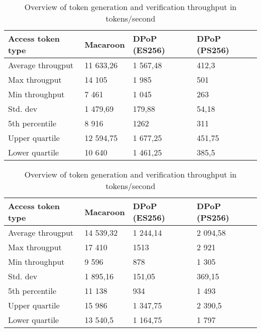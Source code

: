 \begin{table}[H]
\begin{subtable}{1.0\textwidth}
\centering
\begin{tabular}{llll}
\textbf{Access token type} & \textbf{Macaroon} & \textbf{DPoP (ES256)} & \textbf{DPoP (PS256)} \\ \hline
Average througput          & 11 633,26          & 1 567,48               & 412,3                 \\
Max througput              & 14 105             & 1 985                  & 501                   \\
Min throughput             & 7 461              & 1 045                  & 263                   \\
Std. dev                   & 1 479,69           & 179,88                & 54,18                 \\
5th percentile            & 8 916         & 1262            & 311                 \\
Upper quartile             & 12 594,75          & 1 677,25               & 451,75                \\
Lower quartile             & 10 640             & 1 461,25               & 385,5                
\end{tabular}
\caption{Token generation throughput}
\label{table:token-gen-throughput}
\end{subtable}

\vspace*{0.5 cm}

\begin{subtable}{1.0\textwidth}
\centering
\begin{tabular}{llll}
\textbf{Access token type} & \textbf{Macaroon} & \textbf{DPoP (ES256)} & \textbf{DPoP (PS256)} \\ \hline
Average througput          & 14 539,32          & 1 244,14               & 2 094,58               \\
Max througput              & 17 410             & 1513                  & 2 921                  \\
Min throughput             & 9 596              & 878                   & 1 305                  \\
Std. dev                   & 1 895,16           & 151,05                & 369,15                \\
5th percentile            & 11 138          & 934                  & 1 493                \\
Upper quartile             & 15 986             & 1 347,75               & 2 390,5                \\
Lower quartile             & 13 540,5           & 1 164,75               & 1 797                 
\end{tabular}
\caption{Token verification throughput}
\label{table:token-ver-throughput}
\end{subtable}

\caption{Overview of token generation and verification throughput in tokens/second}
\label{table:token-througput}

\end{table}